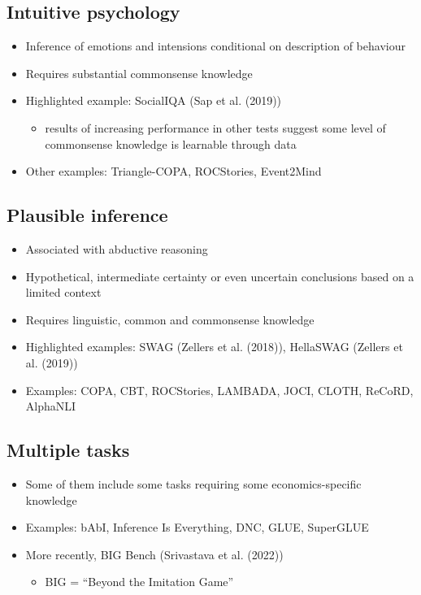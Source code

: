 \documentclass[
]{article}
\providecommand{\tightlist}{%
  \setlength{\itemsep}{0pt}\setlength{\parskip}{0pt}}\usepackage{longtable,booktabs,array}
\begin{document}
\subsection{Intuitive psychology}\label{intuitive-psychology}

\begin{itemize}
\tightlist
\item
  Inference of emotions and intensions conditional on description of
  behaviour
\item
  Requires substantial commonsense knowledge
\item
  Highlighted example: SocialIQA (Sap et al. (2019))

  \begin{itemize}
  \tightlist
  \item
    results of increasing performance in other tests suggest some level
    of commonsense knowledge is learnable through data
  \end{itemize}
\item
  Other examples: Triangle-COPA, ROCStories, Event2Mind
\end{itemize}

\subsection{Plausible inference}\label{plausible-inference}

\begin{itemize}
\tightlist
\item
  Associated with abductive reasoning
\item
  Hypothetical, intermediate certainty or even uncertain conclusions
  based on a limited context
\item
  Requires linguistic, common and commonsense knowledge
\item
  Highlighted examples: SWAG (Zellers et al. (2018)), HellaSWAG (Zellers
  et al. (2019))
\item
  Examples: COPA, CBT, ROCStories, LAMBADA, JOCI, CLOTH, ReCoRD,
  AlphaNLI
\end{itemize}

\subsection{Multiple tasks}\label{multiple-tasks}

\begin{itemize}
\tightlist
\item
  Some of them include some tasks requiring some economics-specific
  knowledge
\item
  Examples: bAbI, Inference Is Everything, DNC, GLUE, SuperGLUE
\item
  More recently, BIG Bench (Srivastava et al. (2022))

  \begin{itemize}
  \tightlist
  \item
    BIG = ``Beyond the Imitation Game''
  \end{itemize}
\end{itemize}
\end{document}
